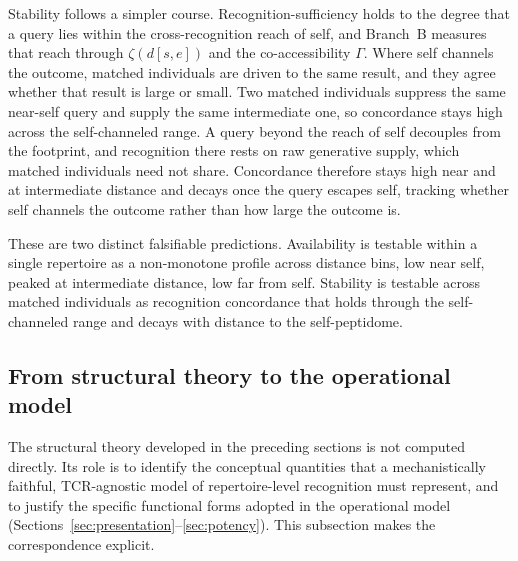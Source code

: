 \documentclass[11pt]{article}
\begin{document}
Stability follows a simpler course. Recognition-sufficiency holds to the degree that a query lies within the cross-recognition reach of self, and Branch~B measures that reach through \(\zeta(d[s,e])\) and the co-accessibility \(\Gamma\). Where self channels the outcome, matched individuals are driven to the same result, and they agree whether that result is large or small. Two matched individuals suppress the same near-self query and supply the same intermediate one, so concordance stays high across the self-channeled range. A query beyond the reach of self decouples from the footprint, and recognition there rests on raw generative supply, which matched individuals need not share. Concordance therefore stays high near and at intermediate distance and decays once the query escapes self, tracking whether self channels the outcome rather than how large the outcome is.

These are two distinct falsifiable predictions. Availability is testable within a single repertoire as a non-monotone profile across distance bins, low near self, peaked at intermediate distance, low far from self. Stability is testable across matched individuals as recognition concordance that holds through the self-channeled range and decays with distance to the self-peptidome.

\subsection{From structural theory to the operational model}
\label{sec:bridge}

The structural theory developed in the preceding sections is not computed directly. Its role is to identify the conceptual quantities that a mechanistically faithful, TCR-agnostic model of repertoire-level recognition must represent, and to justify the specific functional forms adopted in the operational model (Sections~\ref{sec:presentation}--\ref{sec:potency}). This subsection makes the correspondence explicit.
\end{document}
